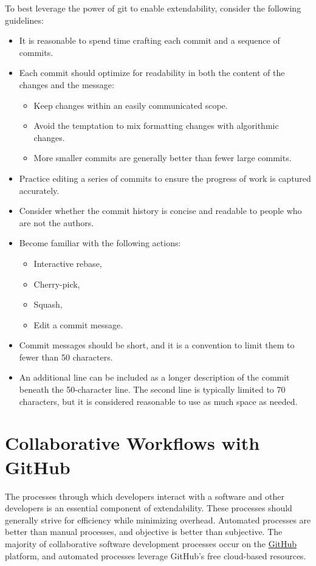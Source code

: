 \documentclass[]{nlr}
\begin{document}
To best leverage the power of git to enable extendability, consider the following guidelines:
\begin{itemize}
\item It is reasonable to spend time crafting each commit and a sequence of commits.
\item Each commit should optimize for readability in both the content of the changes and the message:
\begin{itemize}
    \item Keep changes within an easily communicated scope.
    \item Avoid the temptation to mix formatting changes with algorithmic changes.
    \item More smaller commits are generally better than fewer large commits.
\end{itemize}
\item Practice editing a series of commits to ensure the progress of work is captured accurately.
\item Consider whether the commit history is concise and readable to people who are not the authors.
\item Become familiar with the following actions:
\begin{itemize}
    \item Interactive rebase,
    \item Cherry-pick,
    \item Squash,
    \item Edit a commit message.
\end{itemize}
\item Commit messages should be short, and it is a convention to limit them to fewer than 50 characters.
\item An additional line can be included as a longer description of the commit beneath the
50-character line. The second line is typically limited to 70 characters, but it is
considered reasonable to use as much space as needed.

\end{itemize}


\section{Collaborative Workflows with GitHub}
\label{sec:github}

The processes through which developers interact with a software and other developers is
an essential component of extendability.
These processes should generally strive for efficiency while minimizing overhead.
Automated processes are better than manual processes, and objective is better than subjective.
The majority of collaborative software development processes occur on the
\href{https://github.com}{GitHub} platform, and automated processes leverage GitHub's free
cloud-based resources.
\end{document}
